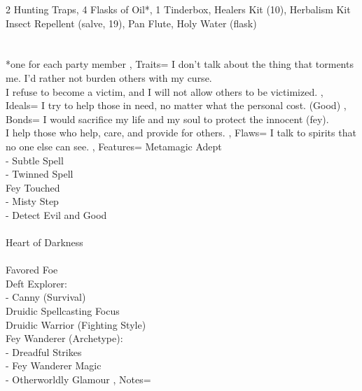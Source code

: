 \documentclass[10pt,a4paper]{scrbook}
\begin{document}
{{			2 Hunting Traps, 4 Flasks of Oil*, 1 Tinderbox, Healers Kit (10), Herbalism Kit\\
			Insect Repellent (salve, 19), Pan Flute, Holy Water (flask)\\
			\\
			\\
			*one for each party member
		},
		Traits={\tiny
			I don't talk about the thing that torments me. I'd rather not burden others with my curse.\\
			I refuse to become a victim, and I will not allow others to be victimized.
		},
		Ideals={
			I try to help those in need, no matter what the personal cost. (Good)
		},
		Bonds={
			\tiny
			I would sacrifice my life and my soul to protect the innocent (fey).\\
			I help those who help, care, and provide for others.
		},
		Flaws={
			I talk to spirits that no one else can see.
		},
		Features={
			Metamagic Adept\\
			- Subtle Spell\\
			- Twinned Spell\\
			Fey Touched\\
			- Misty Step\\
			- Detect Evil and Good\\
			\\
			Heart of Darkness\\
			\\
			Favored Foe\\ %
			Deft Explorer:\\ %
			- Canny (Survival)\\
			Druidic Spellcasting Focus\\
			Druidic Warrior (Fighting Style)\\
			Fey Wanderer (Archetype):\\
			- Dreadful Strikes\\
			- Fey Wanderer Magic\\
			- Otherworldly Glamour
		},
		Notes={
		}
	}
\end{document}
